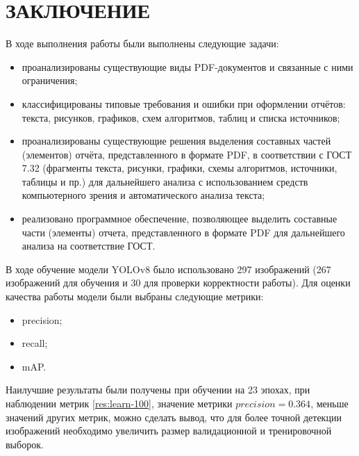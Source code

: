\chapter*{ЗАКЛЮЧЕНИЕ}

В ходе выполнения работы были выполнены следующие задачи:
\begin{itemize}
	\item проанализированы существующие виды PDF-документов и связанные с ними ограничения;
	\item классифицированы типовые требования и ошибки при оформлении отчётов: текста, рисунков, графиков, схем алгоритмов, таблиц и списка источников;
	\item проанализированы существующие решения выделения составных частей (элементов) отчёта, представленного в формате PDF, в соответствии с ГОСТ 7.32 (фрагменты текста, рисунки, графики, схемы алгоритмов, источники, таблицы и пр.) для дальнейшего анализа с использованием средств компьютерного зрения и автоматического анализа текста;
	\item реализовано программное обеспечение, позволяющее выделить составные части (элементы) отчета, представленного в формате PDF для дальнейшего анализа на соответствие ГОСТ. 
\end{itemize}

В ходе обучение модели YOLOv8 было использовано 297 изображений (267 изображений для обучения и 30 для проверки корректности работы). Для оценки качества работы модели были выбраны следующие метрики:
\begin{itemize}
\item precision;
\item recall;
\item mAP.
\end{itemize}
Наилучшие результаты были получены при обучении на 23 эпохах, при наблюдении метрик \ref{res:learn-100}, значение метрики $precision = 0.364$, меньше значений
других метрик, можно сделать вывод, что для более точной детекции изображений необходимо увеличить размер валидационной и тренировочной выборок.




